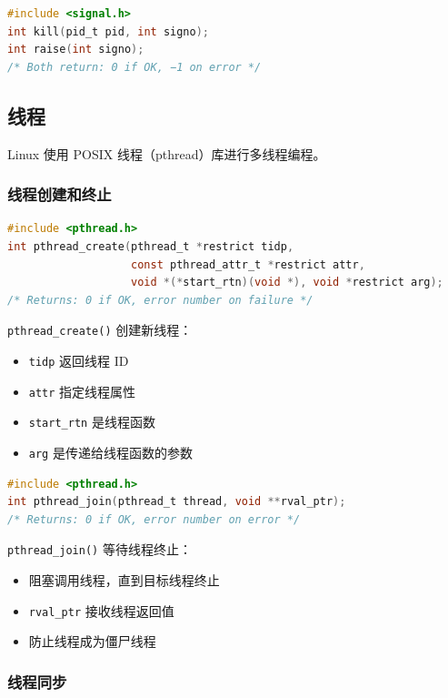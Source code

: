 \begin{lstlisting}[language=C]
#include <signal.h>
int kill(pid_t pid, int signo);
int raise(int signo);
/* Both return: 0 if OK, −1 on error */
\end{lstlisting}

\subsection{线程}

Linux 使用 POSIX 线程（pthread）库进行多线程编程。

\subsubsection{线程创建和终止}


\begin{lstlisting}[language=C]
#include <pthread.h>
int pthread_create(pthread_t *restrict tidp,
                   const pthread_attr_t *restrict attr,
                   void *(*start_rtn)(void *), void *restrict arg);
/* Returns: 0 if OK, error number on failure */
\end{lstlisting}

\texttt{pthread\_create()} 创建新线程：
\begin{itemize}
  \item \texttt{tidp} 返回线程 ID
  \item \texttt{attr} 指定线程属性
  \item \texttt{start\_rtn} 是线程函数
  \item \texttt{arg} 是传递给线程函数的参数
\end{itemize}


\begin{lstlisting}[language=C]
#include <pthread.h>
int pthread_join(pthread_t thread, void **rval_ptr);
/* Returns: 0 if OK, error number on error */
\end{lstlisting}

\texttt{pthread\_join()} 等待线程终止：
\begin{itemize}
  \item 阻塞调用线程，直到目标线程终止
  \item \texttt{rval\_ptr} 接收线程返回值
  \item 防止线程成为僵尸线程
\end{itemize}

\subsubsection{线程同步}

